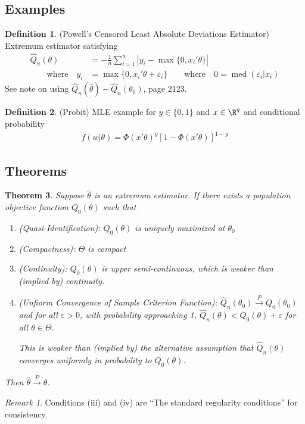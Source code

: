 \documentclass[12pt]{article}
\theoremstyle{plain}
\newtheorem{thm}{Theorem}[section]
\theoremstyle{definition}
\newtheorem{defn}[thm]{Definition}
\theoremstyle{remark}
\newtheorem*{rmk}{Remark}
\newcommand{\med}{\operatorname{med}}
\newcommand{\pto}{\xrightarrow{P}}
\newcommand{\sumin}{\sum^n_{i=1}}
\begin{document}
\clearpage
\subsection{Examples}


\begin{defn}(Powell's Censored Least Absolute Deviations Estimator)
Extremum estimator satisfying
\begin{align*}
  \widehat{Q}_n(\theta)
  &=
  -\frac{1}{n}
  \sumin
  |y_i-\max\{0,x_i'\theta\}|
  \\
  \qquad\text{where}\quad
  y_i
  &=
  \max\{0,x_i'\theta+\varepsilon_i\}
  \qquad\text{where}\quad
  0 = \med(\varepsilon_i|x_i)
\end{align*}
See note on using $\hat{Q}_n(\hat{\theta})-\hat{Q}_n(\theta_0)$, page
2123.
\end{defn}


\begin{defn}(Probit)
MLE example for $y\in\{0,1\}$ and $x\in \R^q$ and conditional
probability
\begin{align*}
  f(w|\theta)
  =
  \Phi(x'\theta)^y
  [1-\Phi(x'\theta)]^{1-y}
\end{align*}
\end{defn}



\clearpage
\subsection{Theorems}


\begin{thm}
Suppose $\hat{\theta}$ is an extremum estimator.
If there exists a population objective function $Q_0(\theta)$ such that
\begin{enumerate}[label=\emph{(\roman*)}]
  \item \emph{(Quasi-Identification)}:
    $Q_0(\theta)$ is uniquely maximized at $\theta_0$
  \item \emph{(Compactness)}: $\Theta$ is compact
  \item \emph{(Continuity)}: $Q_0(\theta)$ is upper semi-continuous,
    which is weaker than (implied by) continuity.
  \item \emph{(Unfiorm Convergence of Sample Criterion Function)}:
    $\widehat{Q}_n(\theta_0)\pto Q_0(\theta_0)$
    and for all $\varepsilon>0$,
    with probability approaching 1,
    $\widehat{Q}_n(\theta)<Q_0(\theta)+\varepsilon$ for all
    $\theta\in\Theta$.

    This is weaker than (implied by) the alternative assumption
    that $\widehat{Q}_n(\theta)$ converges uniformly in probability to
    $Q_0(\theta)$.
\end{enumerate}
Then $\hat{\theta}\pto\theta$.
\end{thm}
\begin{rmk}
Conditions (iii) and (iv) are ``The standard regularity conditions'' for
consistency.
\end{rmk}
\end{document}
